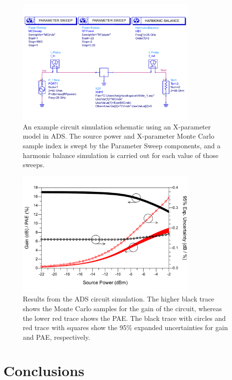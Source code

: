 \documentclass[../thesis/thesis.tex]{subfiles}
\begin{document}
\begin{refsection}
\begin{figure}
	\centering
	\includegraphics[width=0.8\textwidth]{fig6}
	\caption{An example circuit simulation schematic using an X-parameter model in ADS. The source power and X-parameter Monte Carlo sample index is swept by the Parameter Sweep components, and a harmonic balance simulation is carried out for each value of those sweeps.}
	\label{ch5_fig_schematic}
\end{figure}

\begin{figure}
	\centering
	\includegraphics[width=0.8\textwidth]{fig7}
	\caption{Results from the ADS circuit simulation. The higher black trace shows the Monte Carlo samples for the gain of the circuit, whereas the lower red trace shows the PAE. The black trace with circles and red trace with squares show the 95\% expanded uncertainties for gain and PAE, respectively.}
	\label{ch5_fig_adsplot}
\end{figure}

\section{Conclusions}


\end{refsection}
\end{document}
